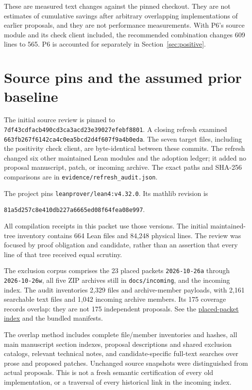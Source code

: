 \documentclass[11pt]{article}
\newcommand{\code}[1]{\nolinkurl{#1}}
\newcommand{\base}{\code{7df43cdfacb490cd3ca3acd23e39027efebf8801}}
\newcommand{\refresh}{\code{663fb267f6142ca4c0ea5bcd2d4f607f9a4b0eda}}
\newcommand{\mathpin}{\code{81a5d257c8e410db227a6665ed08f64fea08e997}}
\newcommand{\repo}[2]{\href{https://github.com/VladimirReshetnikov/ProveIt/blob/7df43cdfacb490cd3ca3acd23e39027efebf8801/Computability/DiophantineConsistency/#1}{#2}}
\begin{document}
These are measured text changes against the pinned checkout. They are not estimates of cumulative savings after arbitrary overlapping implementations of earlier proposals, and they are not performance measurements. With P6's source module and its check client included, the recommended combination changes 609 lines to 565. P6 is accounted for separately in Section~\ref{sec:positive}.

\section{Source pins and the assumed prior baseline}

The initial source review is pinned to \base. A closing refresh examined \refresh. The seven target files, including the positivity check client, are byte-identical between these commits. The refresh changed six other maintained Lean modules and the adoption ledger; it added no proposal manuscript, patch, or incoming archive. The exact paths and SHA-256 comparisons are in \code{evidence/refresh_audit.json}.

The project pins \code{leanprover/lean4:v4.32.0}. Its mathlib revision is
\begin{center}\mathpin.\end{center}
All compilation receipts in this packet use those versions. The initial maintained-tree inventory contains 664 Lean files and 84,248 physical lines. The review was focused by proof obligation and candidate, rather than an assertion that every line of that tree received equal scrutiny.

The exclusion corpus comprises the 23 placed packets \code{2026-10-26a} through \code{2026-10-26w}, all five ZIP archives still in \code{docs/incoming}, and the incoming index. The audit inventories 2,329 files and archive-member payloads, with 2,161 searchable text files and 1,042 incoming archive members. Its 175 coverage records overlap: they are not 175 independent proposals. See the \repo{research/lean-proof-simplification/README.md}{placed-packet index} and the bundled manifests.

The overlap method includes complete file/member inventories and hashes, all main manuscript section indexes, proposal descriptions and shared exclusion catalogs, relevant technical notes, and candidate-specific full-text searches over prose and proposed patches. Unchanged source snapshots were distinguished from actual proposals. This is not a fresh semantic certification of every old implementation, or a traversal of every historical link in the incoming index.
\end{document}
